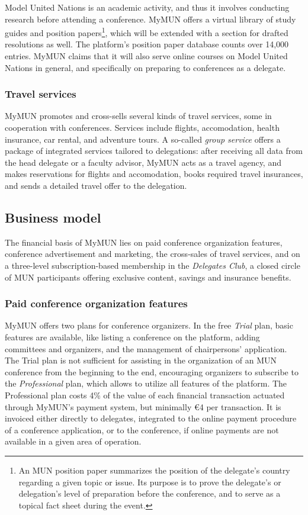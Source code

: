 Model United Nations is an academic activity, and thus it involves conducting research before attending a conference. MyMUN offers a virtual library of study guides and position papers\footnote{An MUN position paper summarizes the position of the delegate's country regarding a given topic or issue. Its purpose is to prove the delegate's or delegation's level of preparation before the conference, and to serve as a topical fact sheet during the event.}, which will be extended with a section for drafted resolutions as well. The platform's position paper database counts over 14,000 entries. MyMUN claims that it will also serve online courses on Model United Nations in general, and specifically on preparing to conferences as a delegate.

\subsubsection{Travel services}

MyMUN promotes and cross-sells several kinds of travel services, some in cooperation with conferences. Services include flights, accomodation, health insurance, car rental, and adventure tours. A so-called \emph{group service} offers a package of integrated services tailored to delegations: after receiving all data from the head delegate or a faculty advisor, MyMUN acts as a travel agency, and makes reservations for flights and accomodation, books required travel insurances, and sends a detailed travel offer to the delegation.

\subsection{Business model}

The financial basis of MyMUN lies on paid conference organization features, conference advertisement and marketing, the cross-sales of travel services, and on a three-level subscription-based membership in the \emph{Delegates Club}, a closed circle of MUN participants offering exclusive content, savings and insurance benefits.

\subsubsection{Paid conference organization features}

MyMUN offers two plans for conference organizers. In the free \emph{Trial} plan, basic features are available, like listing a conference on the platform, adding committees and organizers, and the management of chairpersons' application. The Trial plan is not sufficient for assisting in the organization of an MUN conference from the beginning to the end, encouraging organizers to subscribe to the \emph{Professional} plan, which allows to utilize all features of the platform. The Professional plan costs 4\% of the value of each financial transaction actuated through MyMUN's payment system, but minimally €4 per transaction. It is invoiced either directly to delegates, integrated to the online payment procedure of a conference application, or to the conference, if online payments are not available in a given area of operation.

